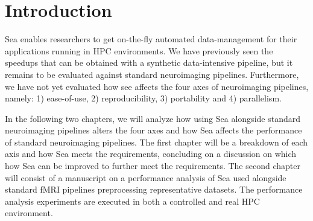 \chapter{Introduction}

Sea enables researchers to get on-the-fly automated data-management for their
applications running in HPC environments. We have previously seen the speedups that
can be obtained with a synthetic data-intensive pipeline, but it remains to be evaluated
against standard neuroimaging pipelines. Furthermore, we have not yet evaluated how see affects
the four axes of neuroimaging pipelines, namely: 1) ease-of-use, 2) reproducibility,
3) portability and 4) parallelism.

In the following two chapters, we will analyze how using Sea alongside standard neuroimaging
pipelines alters the four axes and how Sea affects the performance of standard neuroimaging pipelines.
The first chapter will be a breakdown of each axis and how Sea meets the requirements, concluding
on a discussion on which how Sea can be improved to further meet the requirements. The second chapter
will consist of a manuscript on a performance analysis of Sea used alongside standard fMRI pipelines
preprocessing representative datasets. The performance analysis experiments are executed in both a controlled and
real HPC environment.